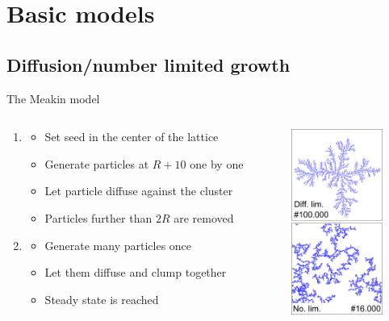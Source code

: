 \documentclass[smaller]{beamer}
\begin{document}
    \section{Basic models}
        \subsection{Diffusion/number limited growth}
            \begin{frame}{The Meakin model}
                \begin{center}
                    \begin{columns}
                        \begin{column}{7cm}
  \begin{enumerate}
    \item \begin{itemize}
            \item Set seed in the center of the lattice
            \item Generate particles at $R+10$ one by one
            \item Let particle diffuse against the cluster
            \item Particles further than $2R$ are removed
          \end{itemize}
\pause
\vspace{1cm}
    \item \begin{itemize}
            \item Generate many particles once
            \item Let them diffuse and clump together
            \item Steady state is reached
          \end{itemize}
  \end{enumerate}
                        \end{column}
                        \begin{column}{3cm}
                            \includegraphics[width=3.0cm]{img/meakin_01.png}
                        \end{column}
                    \end{columns}
                \end{center}
            \end{frame}
\end{document}
